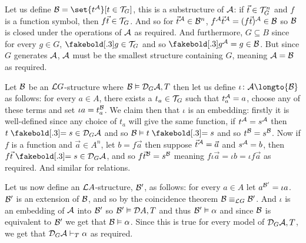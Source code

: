 \eexerc

\benum
    \item Let us define ${\cal B}=\set{t^{\cal A}}[t\in{\cal T}_G]$, this is a substructure of ${\cal A}$: if $\vec t\in{\cal T}_G^n$ and $f$ is a function symbol, then $f\vec t\in{\cal T}_G$.
    And so for $\vec t^{\cal A}\in{\cal B}^n$, $f^{\cal A}\vec t^{\cal A}=(f\vec t)^{\cal A}\in{\cal B}$ so ${\cal B}$ is closed under the operations of ${\cal A}$ as required.
    And furthermore, $G\subseteq B$ since for every $g\in G$, $\boldsymbol g\in{\cal T}_G$ and so $\boldsymbol g^{\cal A}=g\in{\cal B}$.
    But since $G$ generates ${\cal A}$, ${\cal A}$ must be the smallest structure containing $G$, meaning ${\cal A}={\cal B}$ as required.

    \item Let ${\cal B}$ be an ${\cal L}G$-structure where ${\cal B}\vDash{\cal D}_G{\cal A},T$ then let us define $\iota\colon{\cal A}\longto{\cal B}$ as follows: for every $a\in A$, there exists a
    $t_a\in{\cal T}_G$ such that $t_a^{\cal A}=a$, choose any of these terms and set $\iota a=t_a^{\cal B}$.
    We claim then that $\iota$ is an embedding: firstly it is well-defined since any choice of $t_a$ will give the same function, if $t^{\cal A}=s^{\cal A}$ then $t\eq s\in{\cal D}_G{\cal A}$ and so
    ${\cal B}\vDash t\eq s$ and so $t^{\cal B}=s^{\cal B}$.
    Now if $f$ is a function and $\vec a\in A^n$, let $b=f\vec a$ then suppose $\vec t^{\cal A}=\vec a$ and $s^{\cal A}=b$, then $f\vec t\eq s\in{\cal D}_G{\cal A}$, and so $f\vec t^{\cal B}=s^{\cal B}$
    meaning $f\iota\vec a=\iota b=\iota f\vec a$ as required.
    And similar for relations.

    Let us now define an ${\cal L}A$-structure, ${\cal B}'$, as follows: for every $a\in A$ let $a^{\cal B'}=\iota a$.
    ${\cal B}'$ is an extension of ${\cal B}$, and so by the coincidence theorem ${\cal B}\equiv_{{\cal L}G}{\cal B}'$.
    And $\iota$ is an embedding of ${\cal A}$ into ${\cal B}'$ so ${\cal B}'\vDash{\cal D}A,T$ and thus ${\cal B}'\vDash\alpha$ and since ${\cal B}$ is equivalent to ${\cal B}'$ we get that
    ${\cal B}\vDash\alpha$.
    Since this is true for every model of ${\cal D}_G{\cal A},T$, we get that ${\cal D}_G{\cal A}\vdash_T\alpha$ as required.
\eenum

